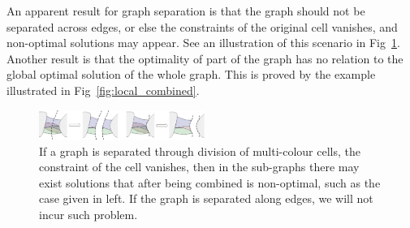 \documentclass[journal]{IEEEtran}
\begin{document}
An apparent result for graph separation is that the graph should not be separated across edges, or else the constraints of the original cell vanishes, and non-optimal solutions may appear. See an illustration of this scenario in Fig~\ref{fig:separation_at_edges}. 
Another result is that the optimality of part of the graph has no relation to the global optimal solution of the whole graph. 
This is proved by the example illustrated in Fig~\ref{fig:local_combined}. 

\begin{figure}[t]
\centering
\includegraphics[width=0.48\textwidth]{figures/separation_at_edges_2}
\caption{If a graph is separated through division of multi-colour cells, the constraint of the cell vanishes, then in the sub-graphs there may exist solutions that after being combined is non-optimal, such as the case given in left. If the graph is separated along edges, we will not incur such problem. }\label{fig:separation_at_edges}
\end{figure}



\end{document}
